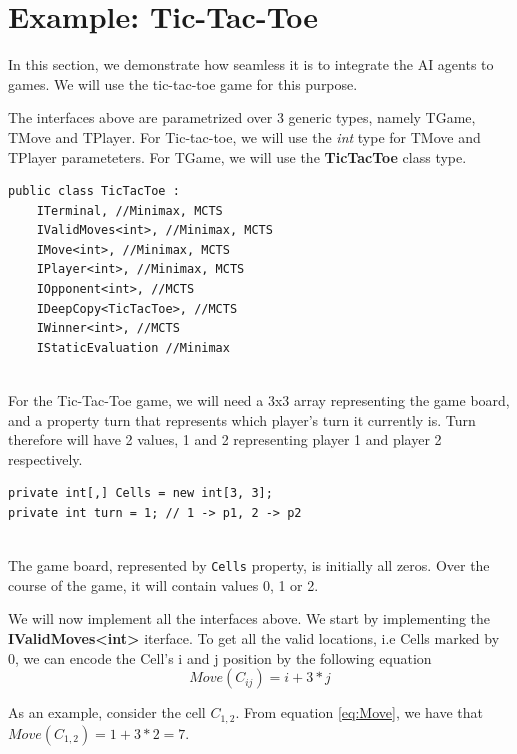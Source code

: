 \section{Example: Tic-Tac-Toe}

In this section, we demonstrate how seamless it is to integrate the \ac{AI} agents to games. We will use the tic-tac-toe game for this purpose.

The interfaces above are parametrized over 3 generic types, namely TGame, TMove and TPlayer. For Tic-tac-toe, we will use the \textit{int} type for TMove and TPlayer parameteters. For TGame, we will use the \textbf{TicTacToe} class type.

\begin{lstlisting}
public class TicTacToe :
    ITerminal, //Minimax, MCTS
    IValidMoves<int>, //Minimax, MCTS
    IMove<int>, //Minimax, MCTS
    IPlayer<int>, //Minimax, MCTS
    IOpponent<int>, //MCTS
    IDeepCopy<TicTacToe>, //MCTS
    IWinner<int>, //MCTS
    IStaticEvaluation //Minimax
\end{lstlisting}
\\
For the Tic-Tac-Toe game, we will need a 3x3 array representing the game board, and a property turn that represents which player's turn it currently is. Turn therefore will have 2 values, 1 and 2 representing player 1 and player 2 respectively.

\begin{lstlisting}
private int[,] Cells = new int[3, 3];
private int turn = 1; // 1 -> p1, 2 -> p2
\end{lstlisting}
\\
The game board, represented by \texttt{Cells} property, is initially all zeros. Over the course of the game, it will contain values 0, 1 or 2.

We will now implement all the interfaces above. We start by implementing the \textbf{IValidMoves\textless{}int\textgreater{}} iterface. To get all the valid locations, i.e Cells marked by 0, we can encode the Cell's i and j position by the following equation
\begin{equation}
\label{eq:Move}
    Move(C_{ij}) = i + 3 * j
\end{equation}

As an example, consider the cell $C_{1,2}$. From equation \ref{eq:Move}, we have that $Move(C_{1,2}) = 1 + 3 * 2 = 7$.

